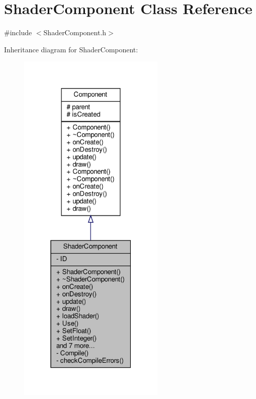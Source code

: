 \hypertarget{classShaderComponent}{}\section{Shader\+Component Class Reference}
\label{classShaderComponent}


{\ttfamily \#include $<$Shader\+Component.\+h$>$}



Inheritance diagram for Shader\+Component\+:
\nopagebreak
\begin{figure}[H]
\begin{center}
\leavevmode
\includegraphics[width=199pt]{classShaderComponent__inherit__graph}
\end{center}
\end{figure}


